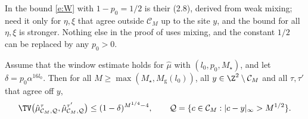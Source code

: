 In \cite{MOS94} the bound \eqref{e:W} with $1 - p_0 = 1/2$ is their (2.8), derived from weak mixing; \cite{MOS94} need it only for $\eta, \xi$ that agree outside $\mathcal C_M$ up to the site $y$, and the bound for all $\eta, \xi$ is stronger. Nothing else in the proof of \cite[Proposition~2.1]{MOS94} uses mixing, and the constant $1/2$ can be replaced by any $p_0 > 0$.

\begin{proposition}\label{p:surgery}
Assume that the window estimate holds for $\hat\mu$ with $(l_0, p_0, M_\star)$, and let $\delta = p_0 \alpha^{16 l_0}$. Then for all $M \ge \max(M_\star, M_{\mathrm g}(l_0))$, all $y \in \Z^2 \setminus \mathcal C_M$ and all $\tau, \tau'$ that agree off $y$,
\begin{equation}\label{e:prop21}
\TV\bigl( \hat\mu^\tau_{\mathcal C_M, \mathcal Q}, \hat\mu^{\tau'}_{\mathcal C_M, \mathcal Q} \bigr) \le (1 - \delta)^{M^{1/4} - 4}, \qquad \mathcal Q = \{ c \in \mathcal C_M : |c - y|_\infty > M^{1/2} \} .
\end{equation}
\end{proposition}

